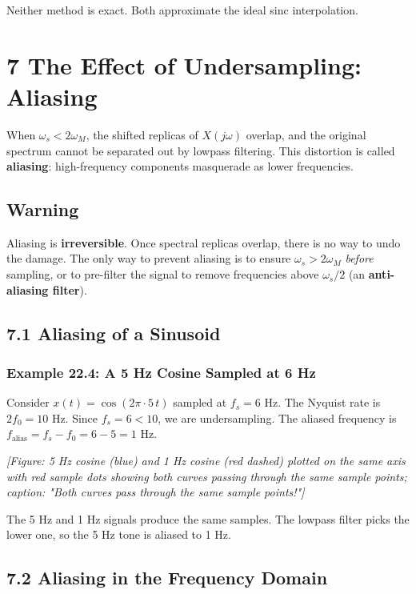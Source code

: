 \documentclass[11pt]{article}
\begin{document}
Neither method is exact. Both approximate the ideal sinc interpolation.

\section*{7 The Effect of Undersampling: Aliasing}

When $\omega_s < 2\omega_M$, the shifted replicas of $X(j\omega)$ overlap, and the original spectrum cannot be separated out by lowpass filtering. This distortion is called \textbf{aliasing}: high-frequency components masquerade as lower frequencies.

\subsection*{Warning}

Aliasing is \textbf{irreversible}. Once spectral replicas overlap, there is no way to undo the damage. The only way to prevent aliasing is to ensure $\omega_s > 2\omega_M$ \textit{before} sampling, or to pre-filter the signal to remove frequencies above $\omega_s/2$ (an \textbf{anti-aliasing filter}).

\subsection*{7.1 Aliasing of a Sinusoid}

\subsubsection*{Example 22.4: A 5 Hz Cosine Sampled at 6 Hz}

Consider $x(t) = \cos(2\pi \cdot 5\,t)$ sampled at $f_s = 6$ Hz. The Nyquist rate is $2f_0 = 10$ Hz. Since $f_s = 6 < 10$, we are undersampling. The aliased frequency is $f_\text{alias} = f_s - f_0 = 6 - 5 = 1$ Hz.

\textit{[Figure: 5 Hz cosine (blue) and 1 Hz cosine (red dashed) plotted on the same axis with red sample dots showing both curves passing through the same sample points; caption: "Both curves pass through the same sample points!"]}

The 5 Hz and 1 Hz signals produce the same samples. The lowpass filter picks the lower one, so the 5 Hz tone is aliased to 1 Hz.

\subsection*{7.2 Aliasing in the Frequency Domain}
\end{document}
